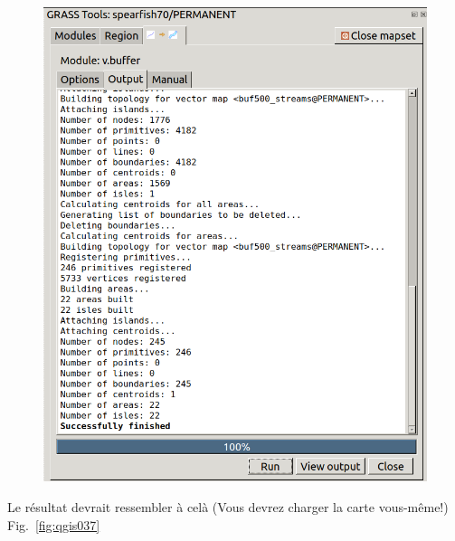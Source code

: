 \begin{figure}[htbp]
   \centering
   \includegraphics[scale=0.3]{qgis036.png}
   \caption{}
   \label{fig:qgis036}
\end{figure}

Le r\'esultat devrait ressembler \`a cel\`a (Vous devrez charger la carte vous-m\^eme!) Fig.~\ref{fig:qgis037}

